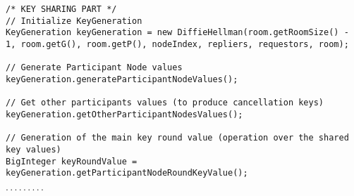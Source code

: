 \begin{verbatim}
/* KEY SHARING PART */
// Initialize KeyGeneration
KeyGeneration keyGeneration = new DiffieHellman(room.getRoomSize() - 1, room.getG(), room.getP(), nodeIndex, repliers, requestors, room);

// Generate Participant Node values
keyGeneration.generateParticipantNodeValues();

// Get other participants values (to produce cancellation keys)
keyGeneration.getOtherParticipantNodesValues();

// Generation of the main key round value (operation over the shared key values)
BigInteger keyRoundValue = keyGeneration.getParticipantNodeRoundKeyValue();
\end{verbatim}
\begin{center}
$\cdot \cdot \cdot \cdot \cdot \cdot \cdot \cdot \cdot$
\end{center}
